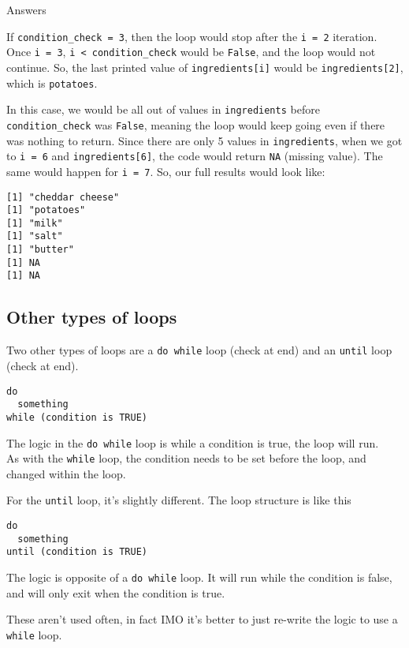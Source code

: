 \documentclass[
]{book}
\begin{document}
Answers

If \texttt{condition\_check\ =\ 3}, then the loop would stop after the \texttt{i\ =\ 2} iteration. Once \texttt{i\ =\ 3}, \texttt{i\ \textless{}\ condition\_check} would be \texttt{False}, and the loop would not continue. So, the last printed value of \texttt{ingredients{[}i{]}} would be \texttt{ingredients{[}2{]}}, which is \texttt{potatoes}.

In this case, we would be all out of values in \texttt{ingredients} before \texttt{condition\_check} was \texttt{False}, meaning the loop would keep going even if there was nothing to return. Since there are only 5 values in \texttt{ingredients}, when we got to \texttt{i\ =\ 6} and \texttt{ingredients{[}6{]}}, the code would return \texttt{NA} (missing value). The same would happen for \texttt{i\ =\ 7}. So, our full results would look like:

\begin{verbatim}
[1] "cheddar cheese"
[1] "potatoes"
[1] "milk"
[1] "salt"
[1] "butter"
[1] NA
[1] NA
\end{verbatim}

\subsection{Other types of loops}\label{other-types-of-loops}

Two other types of loops are a \texttt{do\ while} loop (check at end) and an \texttt{until} loop (check at end).

\begin{verbatim}
do
  something
while (condition is TRUE)
\end{verbatim}

The logic in the \texttt{do\ while} loop is while a condition is true, the loop will run.\\
As with the \texttt{while} loop, the condition needs to be set before the loop, and changed within the loop.

For the \texttt{until} loop, it's slightly different. The loop structure is like this

\begin{verbatim}
do
  something
until (condition is TRUE)
\end{verbatim}

The logic is opposite of a \texttt{do\ while} loop. It will run while the condition is false, and will only exit when the condition is true.

These aren't used often, in fact IMO it's better to just re-write the logic to use a \texttt{while} loop.
\end{document}
